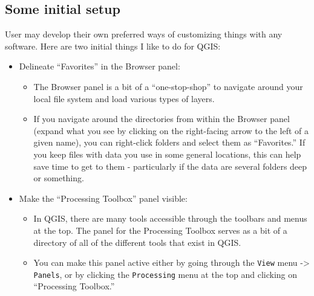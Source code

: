 \documentclass[
  letterpaper,
  DIV=11,
  numbers=noendperiod]{scrreprt}
\providecommand{\tightlist}{%
  \setlength{\itemsep}{0pt}\setlength{\parskip}{0pt}}\usepackage{longtable,booktabs,array}
\begin{document}
\hypertarget{some-initial-setup}{%
\subsection{Some initial setup}\label{some-initial-setup}}

User may develop their own preferred ways of customizing things with any
software. Here are two initial things I like to do for QGIS:

\begin{itemize}
\tightlist
\item
  Delineate ``Favorites'' in the Browser panel:

  \begin{itemize}
  \tightlist
  \item
    The Browser panel is a bit of a ``one-stop-shop'' to navigate around
    your local file system and load various types of layers.
  \item
    If you navigate around the directories from within the Browser panel
    (expand what you see by clicking on the right-facing arrow to the
    left of a given name), you can right-click folders and select them
    as ``Favorites.'' If you keep files with data you use in some
    general locations, this can help save time to get to them -
    particularly if the data are several folders deep or something.
  \end{itemize}
\item
  Make the ``Processing Toolbox'' panel visible:

  \begin{itemize}
  \tightlist
  \item
    In QGIS, there are many tools accessible through the toolbars and
    menus at the top. The panel for the Processing Toolbox serves as a
    bit of a directory of all of the different tools that exist in QGIS.
  \item
    You can make this panel active either by going through the
    \texttt{View} menu -\textgreater{} \texttt{Panels}, or by clicking
    the \texttt{Processing} menu at the top and clicking on ``Processing
    Toolbox.''


\end{itemize}
\end{itemize}
\end{document}
